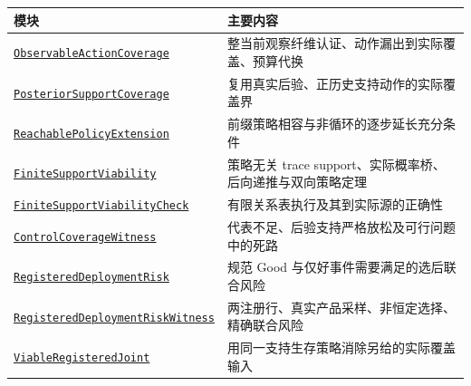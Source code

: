 \documentclass[
  11pt,
  oneside]{book}
\newcounter{none} %
\begin{document}
{\def\LTcaptype{none} %
\begin{longtable}[]{@{}
  >{\raggedright\arraybackslash}p{}
  >{\raggedright\arraybackslash}p{}@{}}
\toprule\noalign{}
\begin{minipage}[b]{\linewidth}\raggedright
模块
\end{minipage} & \begin{minipage}[b]{\linewidth}\raggedright
主要内容
\end{minipage} \\
\midrule\noalign{}
\endhead
\bottomrule\noalign{}
\endlastfoot
\href{../formalization/ueot-core/UEOT/V3/Compression/TheoryCompletion/UnifiedClosure/ObservableActionCoverage.lean}{\nolinkurl{ObservableActionCoverage}} & 整当前观察纤维认证、动作漏出到实际覆盖、预算代换 \\
\href{../formalization/ueot-core/UEOT/V3/Compression/TheoryCompletion/UnifiedClosure/PosteriorSupportCoverage.lean}{\nolinkurl{PosteriorSupportCoverage}} & 复用真实后验、正历史支持动作的实际覆盖界 \\
\href{../formalization/ueot-core/UEOT/V3/Compression/TheoryCompletion/UnifiedClosure/ReachablePolicyExtension.lean}{\nolinkurl{ReachablePolicyExtension}} & 前缀策略相容与非循环的逐步延长充分条件 \\
\href{../formalization/ueot-core/UEOT/V3/Compression/TheoryCompletion/UnifiedClosure/FiniteSupportViability.lean}{\nolinkurl{FiniteSupportViability}} & 策略无关 trace support、实际概率桥、后向递推与双向策略定理 \\
\href{../formalization/ueot-core/UEOT/V3/Compression/TheoryCompletion/UnifiedClosure/FiniteSupportViabilityCheck.lean}{\nolinkurl{FiniteSupportViabilityCheck}} & 有限关系表执行及其到实际源的正确性 \\
\href{../formalization/ueot-core/UEOT/V3/Compression/TheoryCompletion/UnifiedClosure/ControlCoverageWitness.lean}{\nolinkurl{ControlCoverageWitness}} & 代表不足、后验支持严格放松及可行问题中的死路 \\
\href{../formalization/ueot-core/UEOT/V3/Compression/TheoryCompletion/UnifiedClosure/RegisteredDeploymentRisk.lean}{\nolinkurl{RegisteredDeploymentRisk}} & 规范 Good 与仅好事件需要满足的选后联合风险 \\
\href{../formalization/ueot-core/UEOT/V3/Compression/TheoryCompletion/UnifiedClosure/RegisteredDeploymentRiskWitness.lean}{\nolinkurl{RegisteredDeploymentRiskWitness}} & 两注册行、真实产品采样、非恒定选择、精确联合风险 \\
\href{../formalization/ueot-core/UEOT/V3/Compression/TheoryCompletion/UnifiedClosure/ViableRegisteredJoint.lean}{\nolinkurl{ViableRegisteredJoint}} & 用同一支持生存策略消除另给的实际覆盖输入 \\
\end{longtable}
}
\end{document}
